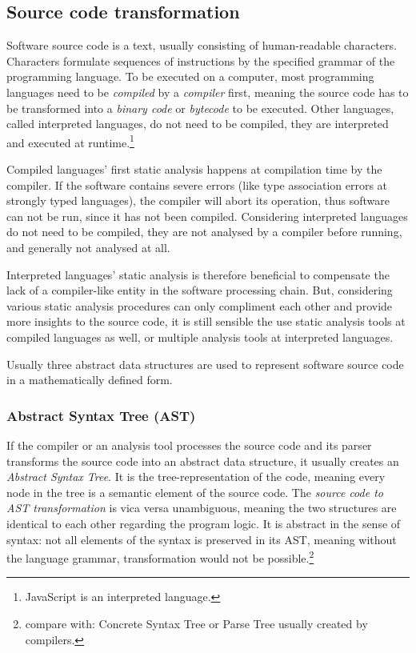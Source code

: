 \subsection{Source code transformation}

Software source code is a text, usually consisting of human-readable characters. Characters formulate sequences of instructions by the specified grammar of the programming language. To be executed on a computer, most programming languages need to be \emph{compiled} by a \emph{compiler} first, meaning the source code has to be transformed into a \emph{binary code} or \emph{bytecode} to be executed. Other languages, called interpreted languages, do not need to be compiled, they are interpreted and executed at runtime.\footnote{JavaScript is an interpreted language.}

Compiled languages' first static analysis happens at compilation time by the compiler. If the software contains severe errors (like type association errors at strongly typed languages), the compiler will abort its operation, thus software can not be run, since it has not been compiled. Considering interpreted languages do not need to be compiled, they are not analysed by a compiler before running, and generally not analysed at all.

Interpreted languages' static analysis is therefore beneficial to compensate the lack of a compiler-like entity in the software processing chain. But, considering various static analysis procedures can only compliment each other and provide more insights to the source code, it is still sensible the use static analysis tools at compiled languages as well, or multiple analysis tools at interpreted languages.

Usually three abstract data structures are used to represent software source code in a mathematically defined form.


\subsubsection{Abstract Syntax Tree (AST)}

If the compiler or an analysis tool processes the source code and its parser transforms the source code into an abstract data structure, it usually creates an \emph{Abstract Syntax Tree}. It is the tree-representation of the code, meaning every node in the tree is a semantic element of the source code. The \emph{source code to AST transformation} is vica versa unambiguous, meaning the two structures are identical to each other regarding the program logic. It is abstract in the sense of syntax: not all elements of the syntax is preserved in its AST, meaning without the language grammar, transformation would not be possible.\footnote{compare with: Concrete Syntax Tree or Parse Tree usually created by compilers.}


